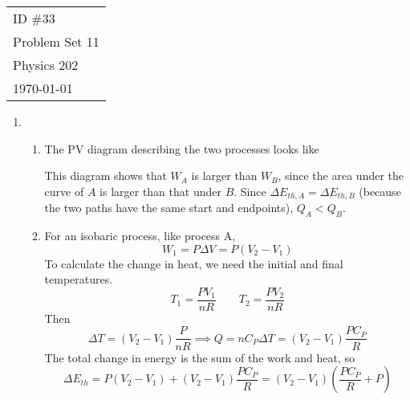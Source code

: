 \documentclass[fleqn]{article}[12pt]
\begin{document}
    \begin{tabular}{l}
        ID \#33 \\
        Problem Set 11 \\
        Physics 202 \\
        \today
    \end{tabular}

\begin{enumerate}
    \item \begin{enumerate}
        \item The PV diagram describing the two processes looks like


        This diagram shows that $W_A$ is larger than $W_B$, since the area under the curve of $A$ is larger than that under $B$. Since $\Delta E_{th,A} = \Delta E_{th,B}$ (because the two paths have the same start and endpoints), $Q_A < Q_B$.

        \item For an isobaric process, like process A,
        \begin{equation*}
            W_1 = P\Delta V = P(V_2-V_1)
        \end{equation*}
        To calculate the change in heat, we need the initial and final temperatures.
        \begin{equation*}
            T_1 = \frac{PV_1}{nR}\qquad T_2 = \frac{PV_2}{nR}
        \end{equation*}
        Then
        \begin{equation*}
            \Delta T = (V_2-V_1)\frac{P}{nR} \implies Q = nC_P \Delta T = (V_2-V_1)\frac{PC_P}{R}
        \end{equation*}
        The total change in energy is the sum of the work and heat, so
        \begin{equation*}
            \Delta E_{th} = P(V_2-V_1) + (V_2-V_1)\frac{PC_P}{R} = (V_2-V_1) \left(\frac{PC_P}{R} + P\right)
        \end{equation*}


\end{enumerate}
\end{enumerate}
\end{document}
